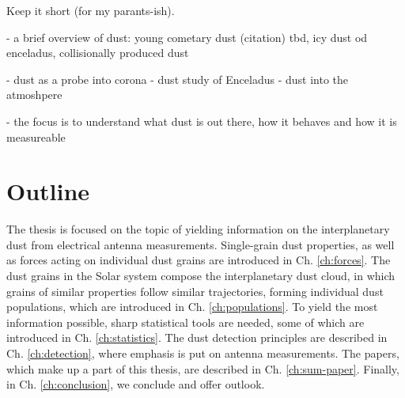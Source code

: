 Keep it short (for my parants-ish). 

- a brief overview of dust: young cometary dust (citation) tbd, icy dust od enceladus, collisionally produced dust

- dust as a probe into corona
- dust study of Enceladus
- dust into the atmoshpere

- the focus is to understand what dust is out there, how it behaves and how it is measureable




\section{Outline}

The thesis is focused on the topic of yielding information on the interplanetary dust from electrical antenna measurements. Single-grain dust properties, as well as forces acting on individual dust grains are introduced in Ch. \ref{ch:forces}. The dust grains in the Solar system compose the interplanetary dust cloud, in which grains of similar properties follow similar trajectories, forming individual dust populations, which are introduced in Ch. \ref{ch:populations}. To yield the most information possible, sharp statistical tools are needed, some of which are introduced in Ch. \ref{ch:statistics}. The dust detection principles are described in Ch. \ref{ch:detection}, where emphasis is put on antenna measurements. The papers, which make up a part of this thesis, are described in Ch. \ref{ch:sum-paper}. Finally, in Ch. \ref{ch:conclusion}, we conclude and offer outlook.